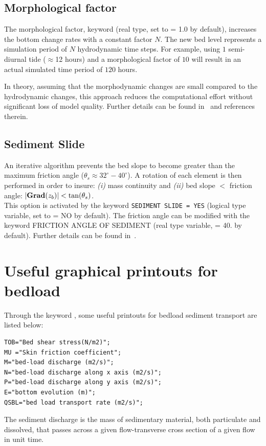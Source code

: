 \subsection{Morphological factor}
The morphological factor, keyword  (real type, set to {\ttfamily = 1.0} by default), increases the bottom change rates with a constant factor $N$. The new bed level represents a simulation period of $N$ hydrodynamic time steps. For example, using $1$ semi-diurnal tide ($\approx$12 hours) and a morphological factor of $10$ will result in an actual simulated time period of $120$ hours.

In theory, assuming that the morphodynamic changes are small compared to the hydrodynamic changes, 
this approach reduces the computational effort without significant loss of model quality. Further details can be found in~\cite{Knaapen12} and references therein.

\subsection{Sediment Slide}
An iterative algorithm prevents the bed slope to become greater than the maximum friction angle ($\theta_s \approx 32^\circ-40^\circ$). A rotation of each element is then performed in order to insure: \textit{(i)} mass continuity and \textit{(ii)} bed slope $<$ friction angle: $|\text{\bfseries{Grad}}(z_b)| < \tan(\theta_s)$.\\

This option is activated by the keyword \texttt{SEDIMENT SLIDE = YES} (logical type variable, set to {\ttfamily = NO} by default). The friction angle can be modified with the keyword {\ttfamily FRICTION ANGLE OF SEDIMENT} (real type variable, {\ttfamily = 40.} by default). Further details can be found in~\cite{ElKadiAbderrezzak201675}.

\pagebreak

\section{Useful graphical printouts for bedload}
Through the keyword , some useful printouts for bedload sediment transport are listed below:
\begin{lstlisting}[frame=trBL]  
TOB="Bed shear stress(N/m2)";
MU ="Skin friction coefficient";
M="bed-load discharge (m2/s)";
N="bed-load discharge along x axis (m2/s)";
P="bed-load discharge along y axis (m2/s)";
E="bottom evolution (m)";
QSBL="bed load transport rate (m2/s)";
\end{lstlisting}
The sediment discharge is the mass of sedimentary material, both particulate and dissolved, that passes across a given flow-transverse cross section of a given flow in unit time.
